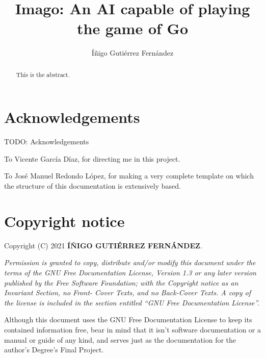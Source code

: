 \documentclass{article}
\newcommand{\program}{Imago}
\begin{document}
\frenchspacing

\title{\program: An AI capable of playing the game of Go}

\author{Íñigo Gutiérrez Fernández}

\date{}

\maketitle

\begin{abstract}
	This is the abstract.
\end{abstract}

\clearpage

\section*{Acknowledgements}

TODO: Acknowledgements

To Vicente García Díaz, for directing me in this project.

To José Manuel Redondo López\cite{plantillaRedondo}, for making a very
complete template on which the structure of this documentation is extensively
based.

\clearpage

\section*{Copyright notice}

\begin{displayquote}

	Copyright (C) 2021 \textbf{ÍÑIGO GUTIÉRREZ FERNÁNDEZ}.

	\textit{Permission is granted to copy, distribute and/or modify this
	document under the terms of the GNU Free Documentation License, Version 1.3
	or any later version published by the Free Software Foundation; with the
	Copyright notice as an Invariant Section, no Front- Cover Texts, and no
	Back-Cover Texts.  A copy of  the license  is  included in  the  section
	entitled ``GNU Free Documentation License''.}

\end{displayquote}

Although this document uses the GNU Free Documentation License to keep its
contained information free, bear in mind that it isn't software documentation or
a manual or guide of any kind, and serves just as the documentation for the
author's Degree's Final Project.
\end{document}
